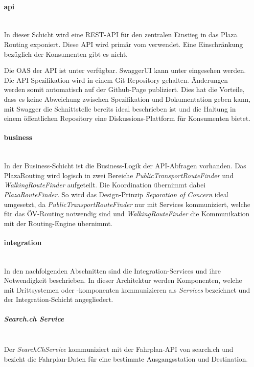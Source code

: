 \paragraph{api}\label{architektur:api-layer}~\\
In dieser Schicht wird eine \ac{REST}-\ac{API} für den zentralen Einstieg in das Plaza Routing exponiert. Diese \ac{API} wird primär vom  verwendet. Eine Einschränkung bezüglich der Konsumenten gibt es nicht.

Die \ac{OAS} \cite{open-api-specificaiton} der \ac{API} ist unter \cite{plaza-routing-api-spez} verfügbar. SwaggerUI kann unter \cite{plaza-routing-api-swaggerui} eingesehen werden. Die {API}-Spezifikation wird in einem Git-Repository gehalten. Änderungen werden somit automatisch auf der Github-Page \cite{plaza-routing-api-spez} publiziert. Dies hat die Vorteile, dass es keine Abweichung zwischen Spezifikation und Dokumentation geben kann, mit Swagger \cite{swagger} die Schnittstelle bereits ideal beschrieben ist und die Haltung in einem öffentlichen Repository eine Diskussions-Plattform für Konsumenten bietet.

\paragraph{business}\label{architektur:business-layer}~\\
In der Business-Schicht ist die Business-Logik der \ac{API}-Abfragen vorhanden. Das PlazaRouting wird logisch in zwei Bereiche \emph{PublicTransportRouteFinder} und \emph{WalkingRouteFinder} aufgeteilt. Die Koordination übernimmt dabei \emph{PlazaRouteFinder}. So wird das Design-Prinzip \emph{Separation of Concern} ideal umgesetzt, da \emph{PublicTransportRouteFinder} nur mit Services kommuniziert, welche für das ÖV-Routing notwendig sind und \emph{WalkingRouteFinder} die Kommunikation mit der Routing-Engine übernimmt.

\paragraph{integration}\label{architektur:integration-layer}~\\
In den nachfolgenden Abschnitten sind die Integration-Services und ihre Notwendigkeit beschrieben. In dieser Architektur werden Komponenten, welche mit Drittsystemen oder -komponenten kommunizieren als \emph{Services} bezeichnet und der Integration-Schicht angegliedert.

\subparagraph{Search.ch Service}\label{architektur:Search.ch Service}~\\
Der \emph{SearchChService} kommuniziert mit der Fahrplan-\ac{API} von search.ch \cite{search_ch_route_api} und bezieht die Fahrplan-Daten für eine bestimmte Ausgangsstation und Destination.

